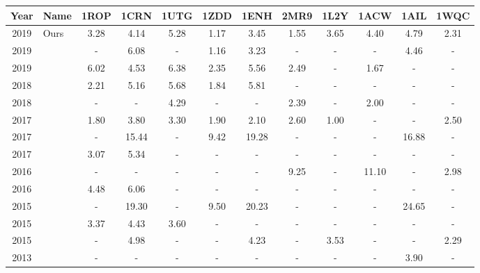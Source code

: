 \begin{sidewaystable}
  \begin{tabular}{c|l|c|c|c|c|c|c|c|c|c|c} \hline \hline
    Year & Name                              & 1ROP  & 1CRN  & 1UTG  & 1ZDD & 1ENH  & 2MR9 & 1L2Y & 1ACW  & 1AIL  & 1WQC \\ \hline \hline
    2019 & Ours                              & 3.28  & 4.14  & 5.28  & 1.17 & 3.45  & 1.55 & 3.65 & 4.40  & 4.79  & 2.31 \\ \hline
    2019 & {\cite{silva2019self}}            & -     & 6.08  & -     & 1.16 & 3.23  & -    & -    & -     & 4.46  & -    \\ \hline
    2019 & {\cite{narloch2019knowledge}}     & 6.02  & 4.53  & 6.38  & 2.35 & 5.56  & 2.49 & -    & 1.67  & -     & -    \\ \hline
    2018 & {\cite{song2018adoption}}         & 2.21  & 5.16  & 5.68  & 1.84 & 5.81  & -    & -    & -     & -     & -    \\ \hline
    2018 & {\cite{borguesan2018genetic}}     & -     & -     & 4.29  & -    & -     & 2.39 & -    & 2.00  & -     & -    \\ \hline
    2017 & {\cite{de2018three}}              & 1.80  & 3.80  & 3.30  & 1.90 & 2.10  & 2.60 & 1.00 & -     & -     & 2.50 \\ \hline
    2017 & {\cite{narloch2017protein}}       & -     & 15.44 & -     & 9.42 & 19.28 & -    & -    & -     & 16.88 & -    \\ \hline
    2017 & {\cite{gao2018incorporation}}     & 3.07  & 5.34  & -     & -    & -     & -    & -    & -     & -     & -    \\ \hline
    2016 & {\cite{borguesan2016improving}}   & -     & -     & -     & -    & -     & 9.25 & -    & 11.10 & -     & 2.98 \\ \hline
    2016 & {\cite{venske2016ademo}}          & 4.48  & 6.06  & -     & -    & -     & -    & -    & -     & -     & -    \\ \hline
    2015 & {\cite{borguesan2015apl}}         & -     & 19.30 & -     & 9.50 & 20.23 & -    & -    & -     & 24.65 & -    \\ \hline
    2015 & {\cite{shehu2015review}}          & 3.37  & 4.43  & 3.60  & -    & -     & -    & -    & -     & -     & -    \\ \hline
    2015 & {\cite{rocha2015multiobjective}}  & -     & 4.98  & -     & -    & 4.23  & -    & 3.53 & -     & -     & 2.29 \\ \hline
    2013 & {\cite{olson2013off}}             & -     & -     & -     & -    & -     & -    & -    & -     & 3.90  & -    \\ \hline

\end{tabular}
\end{sidewaystable}
